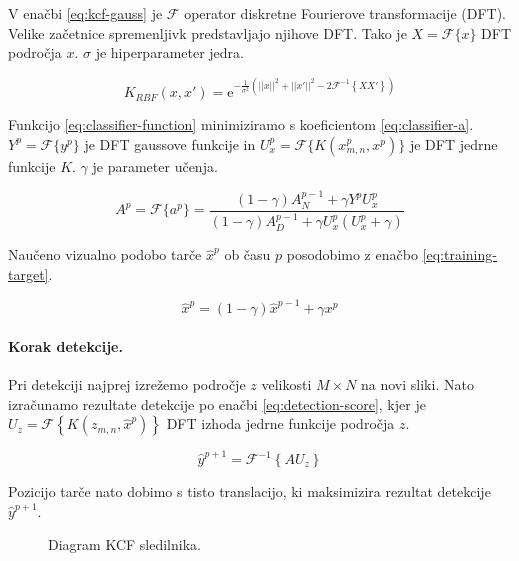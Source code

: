 V enačbi \eqref{eq:kcf-gauss} je $\mathcal{F}$ operator diskretne Fourierove transformacije (DFT). Velike začetnice spremenljivk predstavljajo njihove DFT. Tako je $X = \mathcal{F}\{ {x} \}$ DFT področja $x$. $\sigma$ je hiperparameter jedra.

\begin{equation}
K_{RBF}({x}, {x}') = \mathrm{e}^{-\frac{1}{\sigma^2}\left(
	||{x}||^2 + ||{x}'||^2 - 2 \mathcal{F}^{-1}\left\{ {X} {X}' \right\}
\right)}
\label{eq:kcf-gauss}
\end{equation}

Funkcijo \eqref{eq:classifier-function} minimiziramo s koeficientom \eqref{eq:classifier-a}.  $Y^p = \mathcal{F}\{y^p\}$ je DFT gaussove funkcije in $U_x^p = \mathcal{F}\{ K(x_{m,n}^p, x^p) \}$ je DFT jedrne funkcije $K$. $\gamma$ je parameter učenja.

\begin{equation}
A^p = \mathcal{F}\{a^p\} =  \frac{(1- \gamma) A_N^{p-1} + \gamma Y^p U_x^p}
{(1- \gamma)A_D^{p-1} + \gamma U_x^p\left( U_x^p + \gamma \right)}
\label{eq:classifier-a}
\end{equation}

Naučeno vizualno podobo tarče $\hat{x}^p$ ob času $p$ posodobimo z enačbo \eqref{eq:training-target}.

\begin{equation}
\hat{x}^p = (1 - \gamma) \hat{x}^{p-1} + \gamma x^p
\label{eq:training-target}
\end{equation}


\paragraph{Korak detekcije.}
Pri detekciji najprej izrežemo področje $z$ velikosti $M \times N$ na novi sliki. Nato izračunamo rezultate detekcije po enačbi \eqref{eq:detection-score}, kjer je $U_z = \mathcal{F}\left\{ K\left( z_{m,n}, \hat{x}^{p}  \right) \right\}$ DFT izhoda jedrne funkcije področja $z$.

\begin{equation}
\hat{y}^{p + 1} = \mathcal{F}^{-1}\left\{ A U_z \right\}
\label{eq:detection-score}
\end{equation}

Pozicijo tarče nato dobimo s tisto translacijo, ki maksimizira rezultat detekcije $\hat{y}^{p+1}$.




\begin{figure}[htb]
\centering

\caption[Diagram KCF sledilnika]{Diagram KCF sledilnika.}
\label{fig:diagram-kcf}
\end{figure}







